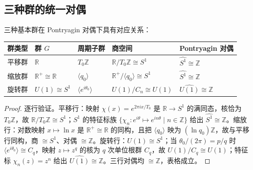 \subsection{三种群的统一对偶}

\begin{theorem}[三种群的统一对偶定理]\label{thm:three_groups_duality}
三种基本群在 Pontryagin 对偶下具有对应关系：
\begin{center}
\begin{tabular}{>{\centering\arraybackslash}p{2.2cm}>{\centering\arraybackslash}p{2.2cm}>{\centering\arraybackslash}p{2.5cm}>{\centering\arraybackslash}p{2.5cm}>{\centering\arraybackslash}p{3cm}}
\toprule
群类型 & 群 $G$ & 周期子群 & 商空间 & Pontryagin 对偶 \\
\midrule
平移群 & $\mathbb{R}$ & $T_0\mathbb{Z}$ & $\mathbb{R}/T_0\mathbb{Z} \cong S^1$ & $\widehat{S^1} \cong \mathbb{Z}$ \\
缩放群 & $\mathbb{R}^+ \cong \mathbb{R}$ & $\langle q_0 \rangle$ & $\mathbb{R}^+/\langle q_0 \rangle \cong S^1$ & $\widehat{S^1} \cong \mathbb{Z}$ \\
旋转群 & $U(1) \cong S^1$ & $\langle e^{i\theta_0} \rangle$ & $U(1)/C_n \cong U(1)$ & $\widehat{U(1)} \cong \mathbb{Z}$ \\
\bottomrule
\end{tabular}
\end{center}
\end{theorem}

\begin{proof}
逐行验证。平移行：映射 $\chi(x)=e^{2\pi i x/T_0}$ 是 $\mathbb{R}\to S^1$ 的满同态，核恰为 $T_0\mathbb{Z}$，故 $\mathbb{R}/T_0\mathbb{Z}\cong S^1$；$S^1$ 的特征标族 $\{\chi_n:e^{i\theta}\mapsto e^{in\theta}\mid n\in\mathbb{Z}\}$ 给出 $\widehat{S^1}\cong\mathbb{Z}$。缩放行：对数映射 $x\mapsto\ln x$ 是 $\mathbb{R}^+\cong\mathbb{R}$ 的同构，且把 $\langle q_0\rangle$ 映为 $(\ln q_0)\mathbb{Z}$，故与平移行同构，商 $\cong S^1$、对偶 $\cong\mathbb{Z}$。旋转行：$U(1)\cong S^1$；当 $\theta_0/(2\pi)=p/q$ 时 $\langle e^{i\theta_0}\rangle\cong C_q$，映射 $z\mapsto z^q$ 的核为 $q$ 次单位根群 $C_q$，故 $U(1)/C_q\cong U(1)$；特征标 $\chi_n(z)=z^n$ 给出 $\widehat{U(1)}\cong\mathbb{Z}$。三行对偶均 $\cong\mathbb{Z}$，表格成立。
\end{proof}

